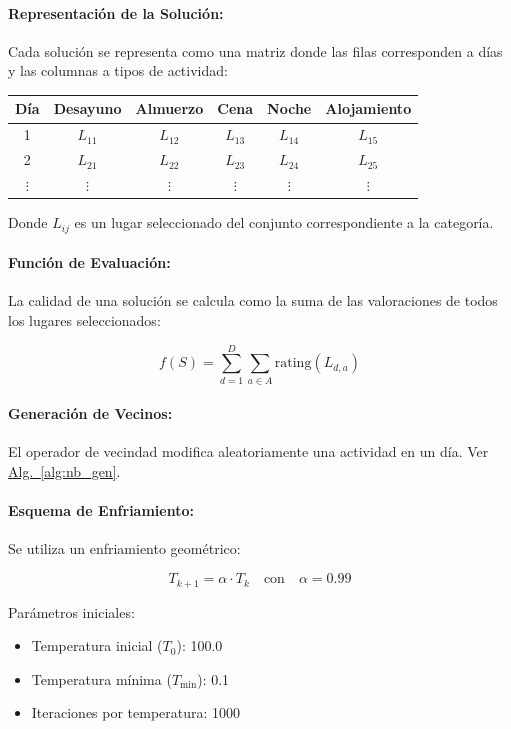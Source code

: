 \documentclass[10pt]{llncs}
\newcommand{\AlgRef}[1]{\hyperref[#1]{Alg.~\ref{#1}}}
\begin{document}
\paragraph{Representación de la Solución:}
Cada solución se representa como una matriz donde las filas corresponden a días y las columnas a tipos de actividad:

\begin{center}
\begin{tabular}{c|c|c|c|c|c}
Día & Desayuno & Almuerzo & Cena & Noche & Alojamiento \\
\midrule
1 & $L_{11}$ & $L_{12}$ & $L_{13}$ & $L_{14}$ & $L_{15}$ \\
2 & $L_{21}$ & $L_{22}$ & $L_{23}$ & $L_{24}$ & $L_{25}$ \\
$\vdots$ & $\vdots$ & $\vdots$ & $\vdots$ & $\vdots$ & $\vdots$ \\
\end{tabular}
\end{center}

Donde $L_{ij}$ es un lugar seleccionado del conjunto correspondiente a la categoría.

\paragraph{Función de Evaluación:}
La calidad de una solución se calcula como la suma de las valoraciones de todos los lugares seleccionados:

\[
f(S) = \sum_{d=1}^{D} \sum_{a \in A} \text{rating}(L_{d,a})
\]

\paragraph{Generación de Vecinos:}
El operador de vecindad modifica aleatoriamente una actividad en un día. Ver \AlgRef{alg:nb_gen}.

\paragraph{Esquema de Enfriamiento:}
Se utiliza un enfriamiento geométrico:

\[
T_{k+1} = \alpha \cdot T_k \quad \text{con} \quad \alpha = 0.99
\]

Parámetros iniciales:
\begin{itemize}
    \item Temperatura inicial ($T_0$): 100.0
    \item Temperatura mínima ($T_{\min}$): 0.1
    \item Iteraciones por temperatura: 1000
\end{itemize}
\end{document}
